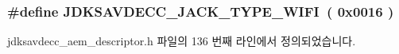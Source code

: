 \subsubsection[{\texorpdfstring{J\+D\+K\+S\+A\+V\+D\+E\+C\+C\+\_\+\+J\+A\+C\+K\+\_\+\+T\+Y\+P\+E\+\_\+\+W\+I\+FI}{JDKSAVDECC_JACK_TYPE_WIFI}}]{\setlength{\rightskip}{0pt plus 5cm}\#define J\+D\+K\+S\+A\+V\+D\+E\+C\+C\+\_\+\+J\+A\+C\+K\+\_\+\+T\+Y\+P\+E\+\_\+\+W\+I\+FI~( 0x0016 )}\hypertarget{group__jack__type_gafa770c686813c451bb7f9979883a2790}{}\label{group__jack__type_gafa770c686813c451bb7f9979883a2790}


jdksavdecc\+\_\+aem\+\_\+descriptor.\+h 파일의 136 번째 라인에서 정의되었습니다.

